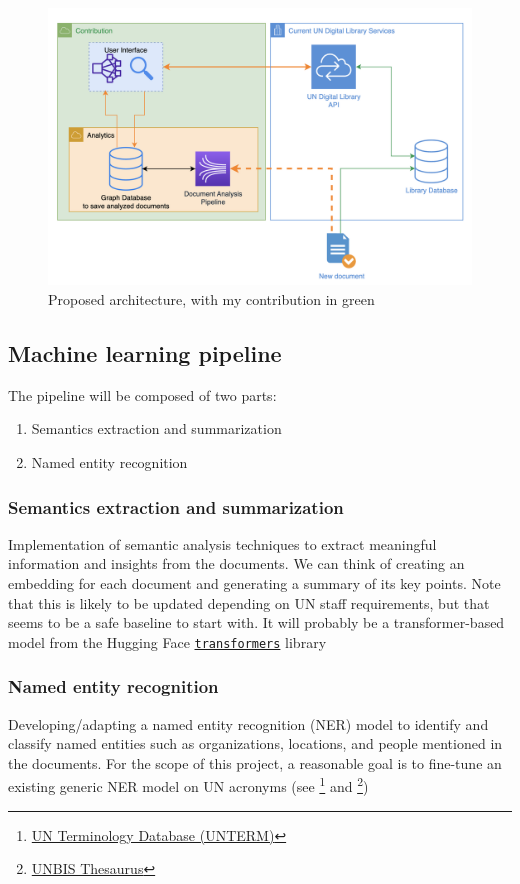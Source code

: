 \documentclass[11pt]{article}
\begin{document}
\begin{figure}[h]
	\centering
	\includegraphics[width=0.9\linewidth]{res/un-infra.png}
	\caption{Proposed architecture, with my contribution in green}
	\label{fig:my_label}
\end{figure}

\subsection{Machine learning pipeline} \label{ml}

The pipeline will be composed of two parts:

\begin{enumerate}
    \item Semantics extraction and summarization
    \item Named entity recognition
\end{enumerate}


\subsubsection{Semantics extraction and summarization}
    
Implementation of semantic analysis techniques to extract meaningful information and insights from the documents. We can think of creating an embedding for each document and generating a summary of its key points. Note that this is likely to be updated depending on UN staff requirements, but that seems to be a safe baseline to start with. It will probably be a transformer-based model from the Hugging Face \href{https://huggingface.co/docs/transformers/index}{\texttt{transformers}} library
    
\subsubsection{Named entity recognition}
Developing/adapting a named entity recognition (NER) model to identify and classify named entities such as organizations, locations, and people mentioned in the documents. For the scope of this project, a reasonable goal is to fine-tune an existing generic NER model on UN acronyms (see \footnote{\href{https://unterm.un.org/unterm2/}{UN Terminology Database (UNTERM)}} and \footnote{\href{https://metadata.un.org/thesaurus/}{UNBIS Thesaurus}})
\end{document}
